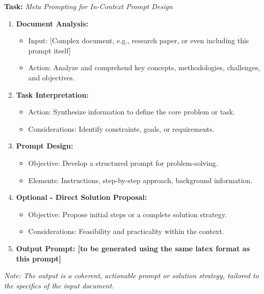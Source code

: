 \begin{tcolorbox}[width=\textwidth,colback=gray!2!white,colframe=gray!50!blue]
    \textbf{Task:} \textit{Meta Prompting for In-Context Prompt Design}
    \begin{enumerate}
        \item \textbf{Document Analysis:} 
            \begin{itemize}
                \item Input: [Complex document, e.g., research paper, or even including this prompt itself]
                \item Action: Analyze and comprehend key concepts, methodologies, challenges, and objectives.
            \end{itemize}

        \item \textbf{Task Interpretation:} 
            \begin{itemize}
                \item Action: Synthesize information to define the core problem or task.
                \item Considerations: Identify constraints, goals, or requirements.
            \end{itemize}

        \item \textbf{Prompt Design:} 
            \begin{itemize}
                \item Objective: Develop a structured prompt for problem-solving.
                \item Elements: Instructions, step-by-step approach, background information.
            \end{itemize}

        \item \textbf{Optional - Direct Solution Proposal:}
            \begin{itemize}
                \item Objective: Propose initial steps or a complete solution strategy.
                \item Considerations: Feasibility and practicality within the context.
            \end{itemize}

        \item \textbf{Output Prompt: [to be generated using the same latex format as this prompt]}
    \end{enumerate}
    \textit{Note: The output is a coherent, actionable prompt or solution strategy, tailored to the specifics of the input document.}
\end{tcolorbox}
